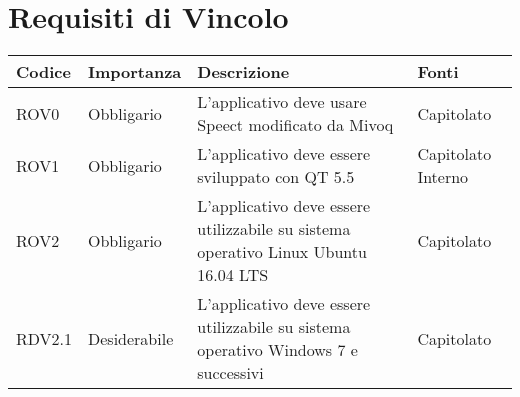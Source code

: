 \documentclass[../AnalisideiRequisiti.tex]{subfiles}
\begin{document}
	\section{Requisiti di Vincolo}
			\begin{longtable}{| p{2cm} | p{2.5cm} |p{5cm} | p{2.5cm} |}
			\hline
			\textbf{Codice} & \textbf{Importanza} & \textbf{Descrizione} & \textbf{Fonti}\\
			\hline
			\endhead
				\newline ROV0&\newline Obbligario&
			\newline 
			L'applicativo deve usare Speect modificato da Mivoq &
			\newline Capitolato
			\\[1em]
			\hline	
			\newline 
			ROV1&\newline Obbligario&
			\newline 
			L'applicativo deve essere sviluppato con QT 5.5 &
			\newline Capitolato
			\newline Interno
			\\[1em]
			\hline
			\newline 
			ROV2&\newline Obbligario&
			\newline 
			L'applicativo deve essere utilizzabile su sistema operativo Linux Ubuntu 16.04 LTS&
			\newline Capitolato
			\\[1em]
			\hline
			\newline
			RDV2.1&\newline Desiderabile&
			\newline 
			L'applicativo deve essere utilizzabile su sistema operativo Windows 7 e successivi&
			\newline Capitolato
			\\[1em]
			\hline
	\end{longtable}
\newpage
\end{document}
